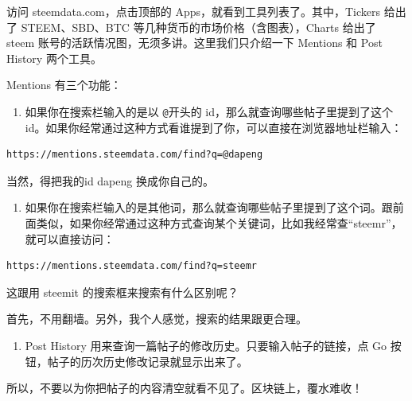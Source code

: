 \documentclass[]{ctexbook}
\providecommand{\tightlist}{%
  \setlength{\itemsep}{0pt}\setlength{\parskip}{0pt}}
\begin{document}
访问 steemdata.com，点击顶部的 Apps，就看到工具列表了。其中，Tickers 给出了 STEEM、SBD、BTC 等几种货币的市场价格（含图表），Charts 给出了 steem 账号的活跃情况图，无须多讲。这里我们只介绍一下 Mentions 和 Post History 两个工具。

Mentions 有三个功能：

\begin{enumerate}
\def\labelenumi{\arabic{enumi}.}
\tightlist
\item
  如果你在搜索栏输入的是以 \texttt{@}开头的 id，那么就查询哪些帖子里提到了这个 id。如果你经常通过这种方式看谁提到了你，可以直接在浏览器地址栏输入：
\end{enumerate}

\begin{verbatim}
https://mentions.steemdata.com/find?q=@dapeng
\end{verbatim}

当然，得把我的id dapeng 换成你自己的。

\begin{enumerate}
\def\labelenumi{\arabic{enumi}.}
\setcounter{enumi}{1}
\tightlist
\item
  如果你在搜索栏输入的是其他词，那么就查询哪些帖子里提到了这个词。跟前面类似，如果你经常通过这种方式查询某个关键词，比如我经常查``steemr''，就可以直接访问：
\end{enumerate}

\begin{verbatim}
https://mentions.steemdata.com/find?q=steemr
\end{verbatim}

这跟用 steemit 的搜索框来搜索有什么区别呢？

首先，不用翻墙。另外，我个人感觉，搜索的结果跟更合理。

\begin{enumerate}
\def\labelenumi{\arabic{enumi}.}
\setcounter{enumi}{2}
\tightlist
\item
  Post History 用来查询一篇帖子的修改历史。只要输入帖子的链接，点 Go 按钮，帖子的历次历史修改记录就显示出来了。
\end{enumerate}

所以，不要以为你把帖子的内容清空就看不见了。区块链上，覆水难收！
\end{document}
